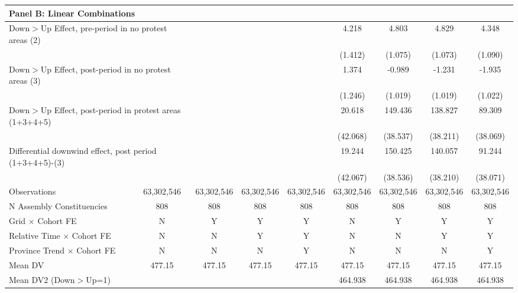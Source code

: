 {\begin{tabular}{l*{8}{c}}
\hline
\multicolumn{9}{l}{\textbf{Panel B: Linear Combinations}} \\ \hline
\multicolumn{2}{l}{Down$>$Up Effect, pre-period in no protest areas (2)}&            &            &            &4.218\sym{***}&4.803\sym{***}&4.829\sym{***}&4.348\sym{***}\\
\multicolumn{2}{l}{}&            &            &            &     (1.412)&     (1.075)&     (1.073)&     (1.090)\\
\multicolumn{2}{l}{Down$>$Up Effect, post-period in no protest areas (3)}&            &            &            &       1.374&      -0.989&      -1.231&-1.935\sym{*}\\
\multicolumn{2}{l}{}&            &            &            &     (1.246)&     (1.019)&     (1.019)&     (1.022)\\
\multicolumn{2}{l}{Down$>$Up Effect, post-period in protest areas (1+3+4+5)}&            &            &            &      20.618&149.436\sym{***}&138.827\sym{***}&89.309\sym{**}\\
\multicolumn{2}{l}{}&            &            &            &    (42.068)&    (38.537)&    (38.211)&    (38.069)\\
\multicolumn{2}{l}{Differential downwind effect, post period (1+3+4+5)-(3)}&            &            &            &      19.244&150.425\sym{***}&140.057\sym{***}&91.244\sym{**}\\
\multicolumn{2}{l}{}&            &            &            &    (42.067)&    (38.536)&    (38.210)&    (38.071)\\



\hline
Observations&  63,302,546&  63,302,546&  63,302,546&  63,302,546&  63,302,546&  63,302,546&  63,302,546&  63,302,546\\
N Assembly Constituencies&         808&         808&         808&         808&         808&         808&         808&         808\\
Grid $\times$ Cohort FE&           N&           Y&           Y&           Y&           N&           Y&           Y&           Y\\
Relative Time $\times$ Cohort FE&           N&           N&           Y&           Y&           N&           N&           Y&           Y\\
Province Trend $\times$ Cohort FE&           N&           N&           N&           Y&           N&           N&           N&           Y\\
Mean DV     &      477.15&      477.15&      477.15&      477.15&      477.15&      477.15&      477.15&      477.15\\
Mean DV2 (Down$>$Up=1)&            &            &            &            &     464.938&     464.938&     464.938&     464.938\\
\hline
\end{tabular}
}
